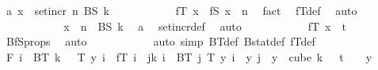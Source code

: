 \begin{isabellebody}
\ a{\isacharcolon}{\kern0pt}\ {\isachardoublequoteopen}x\ {\isasymin}\ set{\isacharunderscore}{\kern0pt}incr\ n\ {\isacharparenleft}{\kern0pt}BS\ k{\isacharparenright}{\kern0pt}{\isachardoublequoteclose}\isanewline
\ \ \ \ \ \ \ \ \isamarkupfalse%
\ \isamarkupfalse%
\ {\isachardoublequoteopen}fT\ x\ {\isacharequal}{\kern0pt}\ fS\ {\isacharparenleft}{\kern0pt}x\ {\isacharminus}{\kern0pt}\ n{\isacharparenright}{\kern0pt}{\isachardoublequoteclose}\ \isamarkupfalse%
\ fact{}\ \isamarkupfalse%
\ fT{\isacharunderscore}{\kern0pt}def\ \isamarkupfalse%
\ auto\isanewline
\ \ \ \ \ \ \ \ \isamarkupfalse%
\ \isamarkupfalse%
\ {\isachardoublequoteopen}x\ {\isacharminus}{\kern0pt}\ n\ {\isasymin}\ BS\ k{\isachardoublequoteclose}\ \isamarkupfalse%
\ a\ \isamarkupfalse%
\ set{\isacharunderscore}{\kern0pt}incr{\isacharunderscore}{\kern0pt}def\ \isamarkupfalse%
\ auto\isanewline
\ \ \ \ \ \ \ \ \isamarkupfalse%
\ \isamarkupfalse%
\ {\isachardoublequoteopen}fT\ x\ {\isasymin}\ {\isacharbraceleft}{\kern0pt}{\isachardot}{\kern0pt}{\isachardot}{\kern0pt}{\isacharless}{\kern0pt}t{\isacharplus}{\kern0pt}{}{\isacharbraceright}{\kern0pt}{\isachardoublequoteclose}\ \isamarkupfalse%
\ BfS{\isacharunderscore}{\kern0pt}props\ \isamarkupfalse%
\ auto\isanewline
\ \ \ \ \ \ \isamarkupfalse%
\isanewline
\ \ \ \ \isamarkupfalse%
{\isacharparenleft}{\kern0pt}auto\ simp{\isacharcolon}{\kern0pt}\ BT{\isacharunderscore}{\kern0pt}def\ Bstat{\isacharunderscore}{\kern0pt}def\ fT{\isacharunderscore}{\kern0pt}def{\isacharparenright}{\kern0pt}\isanewline
\ \ \ \ \isamarkupfalse%
\ \isamarkupfalse%
\ F{}{\isacharcolon}{\kern0pt}\ {\isachardoublequoteopen}{\isacharparenleft}{\kern0pt}{\isacharparenleft}{\kern0pt}{\isasymforall}i\ {\isasymin}\ BT\ {\isacharparenleft}{\kern0pt}k\ {\isacharplus}{\kern0pt}\ {}{\isacharparenright}{\kern0pt}{\isachardot}{\kern0pt}\ T\ y\ i\ {\isacharequal}{\kern0pt}\ fT\ i{\isacharparenright}{\kern0pt}\ {\isasymand}\ {\isacharparenleft}{\kern0pt}{\isasymforall}j{\isacharless}{\kern0pt}k{\isacharplus}{\kern0pt}{}{\isachardot}{\kern0pt}\ {\isasymforall}i\ {\isasymin}\ BT\ j{\isachardot}{\kern0pt}\ {\isacharparenleft}{\kern0pt}T\ y{\isacharparenright}{\kern0pt}\ i\ {\isacharequal}{\kern0pt}\ y\ j{\isacharparenright}{\kern0pt}{\isacharparenright}{\kern0pt}{\isachardoublequoteclose}\ \ {\isachardoublequoteopen}y\ {\isasymin}\ cube\ {\isacharparenleft}{\kern0pt}k\ {\isacharplus}{\kern0pt}\ {}{\isacharparenright}{\kern0pt}\ {\isacharparenleft}{\kern0pt}t\ {\isacharplus}{\kern0pt}\ {}{\isacharparenright}{\kern0pt}{\isachardoublequoteclose}\ \ y\isanewline

\end{isabellebody}
